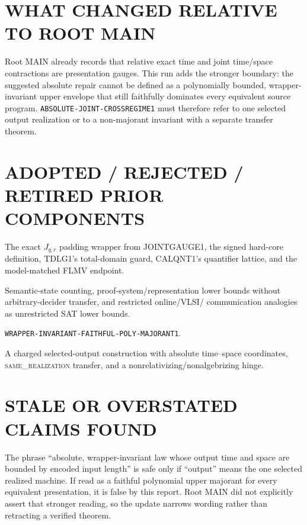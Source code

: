 \documentclass[11pt]{article}
\newcommand{\same}{\textsc{same\_realization}}
\begin{document}
\section{WHAT CHANGED RELATIVE TO ROOT MAIN}

Root MAIN already records that relative exact time and joint time/space
contractions are presentation gauges.  This run adds the stronger boundary:
the suggested absolute repair cannot be defined as a polynomially bounded,
wrapper-invariant upper envelope that still faithfully dominates every
equivalent source program.  \texttt{ABSOLUTE-JOINT-CROSSREGIME1} must therefore
refer to one selected output realization or to a non-majorant invariant with a
separate transfer theorem.

\section{ADOPTED / REJECTED / RETIRED PRIOR COMPONENTS}

\begin{description}[leftmargin=2.5em]
\item[ADOPTED.] The exact $J_{q,r}$ padding wrapper from JOINTGAUGE1, the
  signed hard-core definition, TDLG1's total-domain guard, CALQNT1's quantifier
  lattice, and the model-matched FLMV endpoint.
\item[REJECTED.] Semantic-state counting, proof-system/representation lower
  bounds without arbitrary-decider transfer, and restricted online/VLSI/
  communication analogies as unrestricted SAT lower bounds.
\item[RETIRED.] \texttt{WRAPPER-INVARIANT-FAITHFUL-POLY-MAJORANT1}.
\item[OPEN.] A charged selected-output construction with absolute time--space
  coordinates, \same{} transfer, and a nonrelativizing/nonalgebrizing hinge.
\end{description}

\section{STALE OR OVERSTATED CLAIMS FOUND}

The phrase ``absolute, wrapper-invariant law whose output time and space are
bounded by encoded input length'' is safe only if ``output'' means the one
selected realized machine.  If read as a faithful polynomial upper majorant
for every equivalent presentation, it is false by this report.  Root MAIN did
not explicitly assert that stronger reading, so the update narrows wording
rather than retracting a verified theorem.
\end{document}
